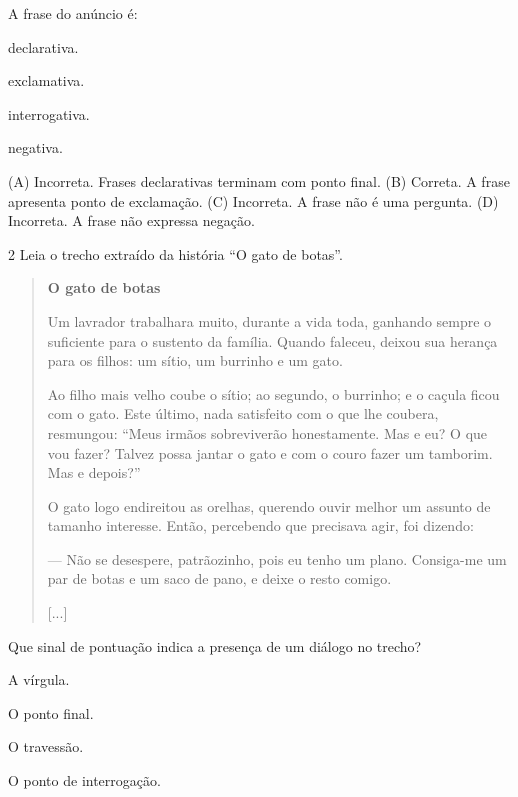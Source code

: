 A frase do anúncio é:

\begin{escolha}
\item
  declarativa.
\item
  exclamativa.
\item
  interrogativa.
\item
  negativa.
\end{escolha}


(A) Incorreta. Frases declarativas terminam com ponto final.
(B) Correta. A frase apresenta ponto de exclamação.
(C) Incorreta. A frase não é uma pergunta.
(D) Incorreta. A frase não expressa negação.

\num{2} Leia o trecho extraído da história ``O gato de botas''.

\begin{quote}
\textbf{O gato de botas}

Um lavrador trabalhara muito, durante a vida toda, ganhando sempre o
suficiente para o sustento da família. Quando faleceu, deixou sua
herança para os filhos: um sítio, um burrinho e um gato.

Ao filho mais velho coube o sítio; ao segundo, o burrinho; e o caçula
ficou com o gato. Este último, nada satisfeito com o que lhe coubera,
resmungou: ``Meus irmãos sobreviverão honestamente. Mas e eu? O que vou
fazer? Talvez possa jantar o gato e com o couro fazer um tamborim. Mas e
depois?''

O gato logo endireitou as orelhas, querendo ouvir melhor um assunto de
tamanho interesse. Então, percebendo que precisava agir, foi dizendo:

--- Não se desespere, patrãozinho, pois eu tenho um plano. Consiga-me um
par de botas e um saco de pano, e deixe o resto comigo.

{[}...{]}

\end{quote}

Que sinal de pontuação indica a presença de um diálogo no trecho?

\begin{escolha}
\item
  A vírgula.
\item
  O ponto final.
\item
  O travessão.
\item
  O ponto de interrogação.
\end{escolha}

